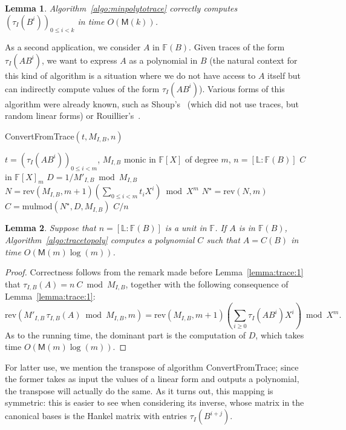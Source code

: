 \documentclass[12pt]{article}
\def\M {\ensuremath{\mathsf{M}}}
\def\F {\ensuremath{\mathbb{F}}}
\def\L {\ensuremath{\mathbb{L}}}
\def\mulmod {\ensuremath{\mathrm{mulmod}}}
\def\rev {\ensuremath{\mathrm{rev}}}
\newtheorem{Lemma}{Lemma}
\begin{document}
\begin{Lemma}\label{lemma:computetrace}
  Algorithm~\ref{algo:minpolytotrace} correctly computes
  $(\tau_I(B^i))_{0 \le i < k}$ in time $O(\M(k))$.
\end{Lemma}

As a second application, we consider $A$ in $\F(B)$. Given traces of
the form $\tau_I(A B^i)$, we want to express $A$ as a polynomial in
$B$ (the natural context for this kind of algorithm is a situation
where we do not have access to $A$ itself but can indirectly compute
values of the form $\tau_I(A B^i)$). Various forms of this algorithm
were already known, such as Shoup's~\cite{shoup94} (which did not use
traces, but random linear forms) or Rouillier's~\cite{rouiller99}.

\begin{algorithm}[H]
  \caption{ConvertFromTrace$(t, M_{I,B}, n)$}
  \begin{algorithmic}[1]
    \REQUIRE  $t=(\tau_I(A B^i))_{0 \le i < m}$, $M_{I,B}$ monic in $\F[X]$ of degree $m$, $n=[\L:\F(B)]$
    \ENSURE $C$ in $\F[X]_m$
    \STATE $D =  1/M'_{I,B} \bmod M_{I,B}$
    \STATE $N=\rev(M_{I,B}, m+1)( \sum_{0 \le i <m} t_i X^i) \bmod X^m$
    \STATE $N^\star = \rev(N, m)$
    \STATE $C=\mulmod(N^\star, D, M_{I,B})$
    \RETURN $C/n$
  \end{algorithmic}
  \label{algo:tracetopoly}
\end{algorithm}

\begin{Lemma}
  Suppose that $n=[\L:\F(B)]$ is a unit in $\F$. If $A$ is in
  $\F(B)$, Algorithm~\ref{algo:tracetopoly} computes a polynomial $C$
  such that $A=C(B)$ in time $O(\M(m)\log(m))$.
\end{Lemma}
\begin{proof}
  Correctness follows from the remark made before
  Lemma~\ref{lemma:trace:1} that $\tau_{I,B}(A)=n \ C \bmod M_{I,B}$,
  together with the following consequence of Lemma~\ref{lemma:trace:1}:
$$ \rev( M'_{I,B}\, \tau_{I,B}  (A) \bmod M_{I,B},m) = \rev(M_{I,B},m+1) \left (\sum_{i \ge 0} \tau_I(A B^i) X^i \right )  \bmod X^m.$$
  As to the running time, the dominant part is the computation of $D$,
  which takes time $O(\M(m)\log(m))$.
\end{proof}

For latter use, we mention the transpose of algorithm
ConvertFromTrace; since the former takes as input the values of a
linear form and outputs a polynomial, the transpose will actually do
the same. As it turns out, this mapping is symmetric: this is easier
to see when considering its inverse, whose matrix in the canonical
bases is the Hankel matrix with entries $\tau_I(B^{i+j})$.
\end{document}
